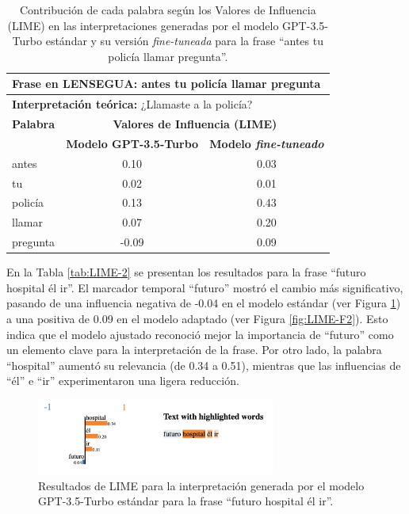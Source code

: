 \vspace{0.5cm}
\begin{table}[H]
\centering
    \begin{tabular}{|l|c|c|}
        \hline
        \multicolumn{3}{|l|}{\textbf{Frase en LENSEGUA:} antes tu policía llamar pregunta} \\ \hline
        \multicolumn{3}{|l|}{\textbf{Interpretación teórica:} ¿Llamaste a la policía?} \\ \hline \hline
        
        \textbf{Palabra} & \multicolumn{2}{c|}{\textbf{Valores de Influencia (LIME)}} \\ 
        \cline{2-3}
         & \textbf{Modelo GPT-3.5-Turbo} & \textbf{Modelo \textit{fine-tuneado}} \\
         
        \hline
        antes & 0.10 & 0.03 \\
        \hline
        tu & 0.02 & 0.01 \\
        \hline
        policía & 0.13  & 0.43 \\
        \hline
        llamar & 0.07  & 0.20 \\
        \hline
        pregunta & -0.09  & 0.09 \\
        \hline
    \end{tabular}
\caption{Contribución de cada palabra según los Valores de Influencia (LIME) en las interpretaciones generadas por el modelo GPT-3.5-Turbo estándar y su versión \textit{fine-tuneada} para la frase “antes tu policía llamar pregunta”.}
\label{tab:LIME-1}
\end{table}

En la Tabla \ref{tab:LIME-2} se presentan los resultados para la frase “futuro hospital él ir”. El marcador temporal “futuro” mostró el cambio más significativo, pasando de una influencia negativa de -0.04 en el modelo estándar (ver Figura \ref{fig:LIME-O2}) a una positiva de 0.09 en el modelo adaptado (ver Figura \ref{fig:LIME-F2}). Esto indica que el modelo ajustado reconoció mejor la importancia de “futuro” como un elemento clave para la interpretación de la frase. Por otro lado, la palabra “hospital” aumentó su relevancia (de 0.34 a 0.51), mientras que las influencias de “él” e “ir” experimentaron una ligera reducción.

\begin{figure}[H]
\centering
    \includegraphics[width=0.7\textwidth]{figuras/LIME/LIME-O2.png}
    \caption{Resultados de LIME para la interpretación generada por el modelo GPT-3.5-Turbo estándar para la frase “futuro hospital él ir”.}
    \label{fig:LIME-O2}
\end{figure}

